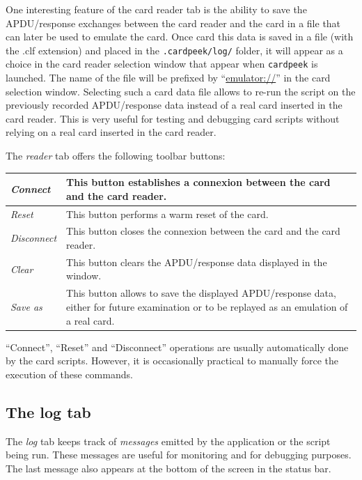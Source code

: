 \documentclass[11pt]{report}
\newcommand{\syn}[1]{\texttt{#1}}
\begin{document}
One interesting feature of the card reader tab is the ability to save the APDU/response exchanges between the card reader and
the card in a file that can later be used to emulate the card. Once card this data is saved in a file (with the .clf
extension) and placed in the \syn{.cardpeek/log/} folder, it will appear as a choice in the card reader selection
window that appear when \texttt{cardpeek} is launched. The name of the file will be prefixed by 
``\url{emulator://}'' in the card selection window. Selecting such a card data file allows to re-run the script
on the previously recorded APDU/response data instead of a real card inserted in the card reader. This is very useful for
testing and debugging card scripts without relying on a real card inserted in the card reader.

The \emph{reader} tab offers the following toolbar buttons:

\vspace{1em}\noindent
\begin{tabular}{l|p{12cm}}
\hline
\emph{Connect}    & This button establishes a connexion between the card and the card reader. \\  
\hline
\emph{Reset}      & This button performs a warm reset of the card.\\
\hline
\emph{Disconnect} & This button closes the connexion between the card and the card reader.\\
\hline
\emph{Clear}      & This button clears the APDU/response data displayed in the window. \\
\hline
\emph{Save as}     & This button allows to save the displayed APDU/response data, either for future examination or
		     to be replayed as an emulation of a real card. \\
\hline
\end{tabular}
\vspace{2em}

``Connect'', ``Reset'' and ``Disconnect'' operations are usually automatically done by the card scripts.
However, it is occasionally practical to manually force the execution of these commands.

\subsection{The log tab}

The \emph{log} tab keeps track of \emph{messages} emitted by the application or the script being run.
These messages are useful for monitoring and for debugging purposes. 
The last message also appears at the bottom of the screen in the status bar.
\end{document}
